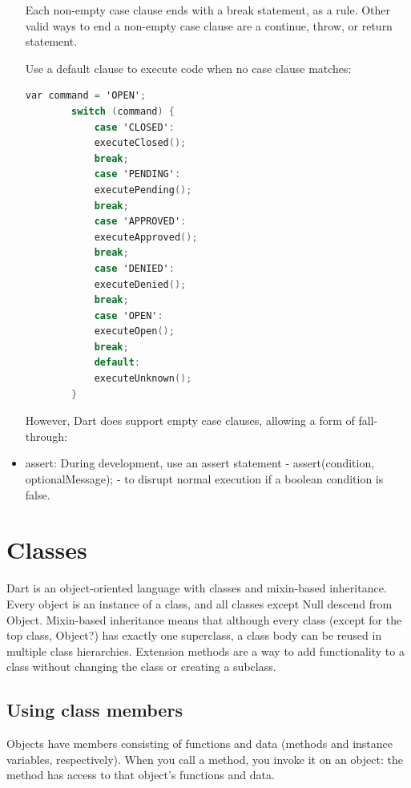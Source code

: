 \begin{itemize}
	Each non-empty case clause ends with a break statement, as a rule. Other valid ways to end a non-empty case clause are a continue, throw, or return statement.
	
	Use a default clause to execute code when no case clause matches:
	
	\begin{lstlisting}[language=C]
		var command = 'OPEN';
		switch (command) {
			case 'CLOSED':
			executeClosed();
			break;
			case 'PENDING':
			executePending();
			break;
			case 'APPROVED':
			executeApproved();
			break;
			case 'DENIED':
			executeDenied();
			break;
			case 'OPEN':
			executeOpen();
			break;
			default:
			executeUnknown();
		}
	\end{lstlisting}
	However, Dart does support empty case clauses, allowing a form of fall-through:
	
	\item assert: During development, use an assert statement - assert(condition, optionalMessage); - to disrupt normal execution if a boolean condition is false. 
\end{itemize}
\section{Classes}
Dart is an object-oriented language with classes and mixin-based inheritance. Every object is an instance of a class, and all classes except Null descend from Object. Mixin-based inheritance means that although every class (except for the top class, Object?) has exactly one superclass, a class body can be reused in multiple class hierarchies. Extension methods are a way to add functionality to a class without changing the class or creating a subclass.
\subsection{Using class members}
Objects have members consisting of functions and data (methods and instance variables, respectively). When you call a method, you invoke it on an object: the method has access to that object's functions and data.

